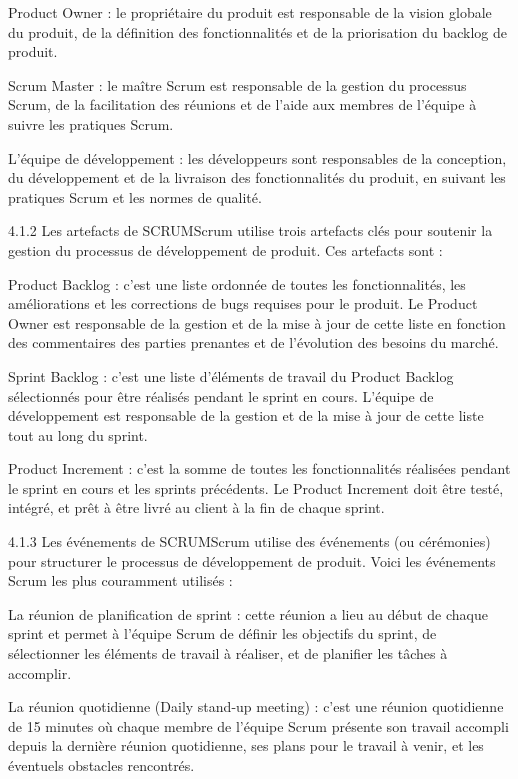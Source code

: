 \documentclass{article}
\begin{document}
Product Owner : le propriétaire du produit est responsable de la vision globale du produit, de la définition des fonctionnalités et de la priorisation du backlog de produit.

Scrum Master : le maître Scrum est responsable de la gestion du processus Scrum, de la facilitation des réunions et de l’aide aux membres de l’équipe à suivre les pratiques Scrum.

L’équipe de développement : les développeurs sont responsables de la conception, du développement et de la livraison des fonctionnalités du produit, en suivant les pratiques Scrum et les normes de qualité.

4.1.2 Les artefacts de SCRUMScrum utilise trois artefacts clés pour soutenir la gestion du processus de développement de produit. Ces artefacts sont :

Product Backlog : c’est une liste ordonnée de toutes les fonctionnalités, les améliorations et les corrections de bugs requises pour le produit. Le Product Owner est responsable de la gestion et de la mise à jour de cette liste en fonction des commentaires des parties prenantes et de l’évolution des besoins du marché.

Sprint Backlog : c’est une liste d’éléments de travail du Product Backlog sélectionnés pour être réalisés pendant le sprint en cours. L’équipe de développement est responsable de la gestion et de la mise à jour de cette liste tout au long du sprint.

Product Increment : c’est la somme de toutes les fonctionnalités réalisées pendant le sprint en cours et les sprints précédents. Le Product Increment doit être testé, intégré, et prêt à être livré au client à la fin de chaque sprint.

4.1.3  Les événements de SCRUMScrum utilise des événements (ou cérémonies) pour structurer le processus de développement de produit. Voici les événements Scrum les plus couramment utilisés :

La réunion de planification de sprint : cette réunion a lieu au début de chaque sprint et permet à l’équipe Scrum de définir les objectifs du sprint, de sélectionner les éléments de travail à réaliser, et de planifier les tâches à accomplir.

La réunion quotidienne (Daily stand-up meeting) : c’est une réunion quotidienne de 15 minutes où chaque membre de l’équipe Scrum présente son travail accompli depuis la dernière réunion quotidienne, ses plans pour le travail à venir, et les éventuels obstacles rencontrés.
\end{document}
